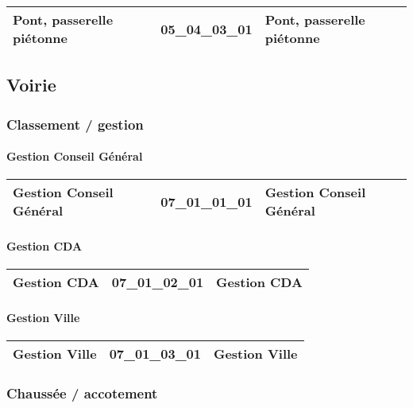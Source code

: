 \documentclass[12pt,titlepage,oneside]{book}
\begin{document}
\renewcommand{\arraystretch}{1.2}
\begin{supertabular}{|p{10cm}|c|p{15cm}|}
 Pont, passerelle piétonne & 05\_04\_03\_01 & Pont, passerelle piétonne\\
\hline
\end{supertabular}
\subsection{Voirie}
\subsubsection{\large Classement / gestion}
\paragraph{Gestion Conseil Général}
\noindent
\vspace{\baselineskip}

\renewcommand{\arraystretch}{1.2}
\begin{supertabular}{|p{10cm}|c|p{15cm}|}
 Gestion Conseil Général & 07\_01\_01\_01 & Gestion Conseil Général\\
\hline
\end{supertabular}


\paragraph{Gestion CDA}
\noindent
\vspace{\baselineskip}

\renewcommand{\arraystretch}{1.2}
\begin{supertabular}{|p{10cm}|c|p{15cm}|}
 Gestion CDA & 07\_01\_02\_01 & Gestion CDA\\
\hline
\end{supertabular}


\paragraph{Gestion Ville}
\noindent
\vspace{\baselineskip}

\renewcommand{\arraystretch}{1.2}
\begin{supertabular}{|p{10cm}|c|p{15cm}|}
 Gestion Ville & 07\_01\_03\_01 & Gestion Ville\\
\hline
\end{supertabular}

\subsubsection{\large Chaussée / accotement}
\end{document}
